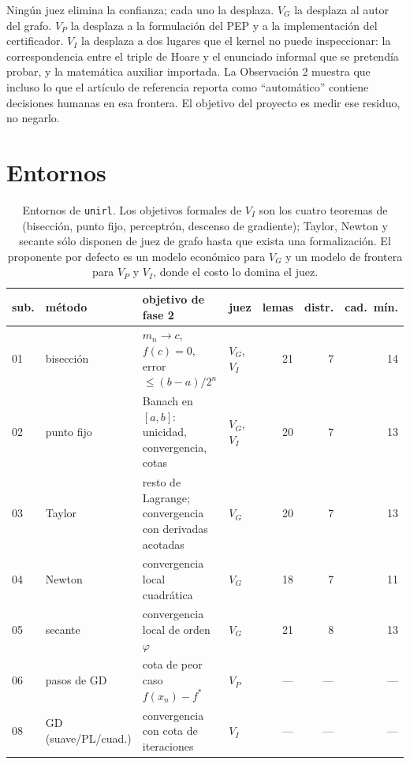 \documentclass[11pt,a4paper]{article}
\begin{document}
Ningún juez elimina la confianza; cada uno la desplaza. $V_G$ la desplaza al autor del grafo. $V_P$ la desplaza a la formulación del PEP y a la implementación del certificador. $V_I$ la desplaza a dos lugares que el kernel no puede inspeccionar: la correspondencia entre el triple de Hoare y el enunciado informal que se pretendía probar, y la matemática auxiliar importada. La Observación 2 muestra que incluso lo que el artículo de referencia reporta como ``automático'' contiene decisiones humanas en esa frontera. El objetivo del proyecto es medir ese residuo, no negarlo.

\section{Entornos}

\begin{table}[h]
\centering
\footnotesize
\begin{tabular}{@{}llp{5.0cm}lrrr@{}}
\toprule
sub. & método & objetivo de fase 2 & juez & lemas & distr. & cad.\ mín. \\
\midrule
01 & bisección & $m_n \to c$, $f(c)=0$, error $\le (b-a)/2^n$ & $V_G$, $V_I$ & 21 & 7 & 14 \\
02 & punto fijo & Banach en $[a,b]$: unicidad, convergencia, cotas & $V_G$, $V_I$ & 20 & 7 & 13 \\
03 & Taylor & resto de Lagrange; convergencia con derivadas acotadas & $V_G$ & 20 & 7 & 13 \\
04 & Newton & convergencia local cuadrática & $V_G$ & 18 & 7 & 11 \\
05 & secante & convergencia local de orden $\varphi$ & $V_G$ & 21 & 8 & 13 \\
06 & pasos de GD & cota de peor caso $f(x_n)-f^*$ & $V_P$ & --- & --- & --- \\
08 & GD (suave/PL/cuad.) & convergencia con cota de iteraciones & $V_I$ & --- & --- & --- \\
\bottomrule
\end{tabular}
\caption{Entornos de \texttt{unirl}. Los objetivos formales de $V_I$ son los cuatro teoremas de \citet{BryantHuertaFoster2026} (bisección, punto fijo, perceptrón, descenso de gradiente); Taylor, Newton y secante sólo disponen de juez de grafo hasta que exista una formalización. El proponente por defecto es un modelo económico para $V_G$ y un modelo de frontera para $V_P$ y $V_I$, donde el costo lo domina el juez.}
\label{tab:envs}
\end{table}
\end{document}
